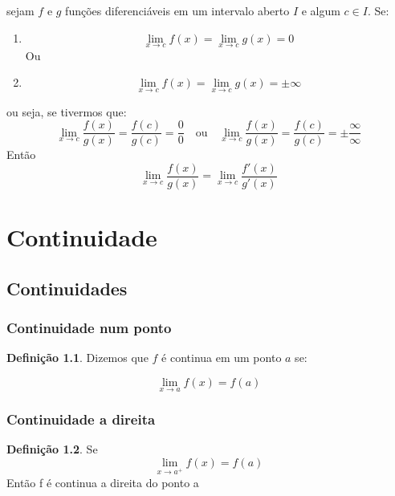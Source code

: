 \documentclass[14pt]{extreport}
\theoremstyle{definition}
\newtheorem{definition}{Definição}
\begin{document}
sejam \(f\) e \(g\) funções diferenciáveis em um intervalo aberto \(I\) e algum \(c \in I\). Se:
\begin{enumerate}
    \item{ 
        \[
            \lim_{x \to c} f(x) = \lim_{x \to c} g(x)  = 0 
        \]
    }
    Ou
    \item{ 
        \[
            \lim_{x \to c} f(x) = \lim_{x \to c} g(x)  = \pm \infty 
        \]
    }
\end{enumerate}
ou seja, se tivermos que:
\begin{equation*}
    \lim_{x \to c} \frac{f(x)}{g(x)} = \frac{f(c)}{g(c)} = \frac{0}{0} 
    \quad \text{ou} \quad
    \lim_{x \to c} \frac{f(x)}{g(x)} = \frac{f(c)}{g(c)} = \pm \frac{\infty}{\infty}
\end{equation*}
Então
\begin{equation}
    \lim_{x \to c} \frac{f(x)}{g(x)} = 
    \lim_{x \to c} \frac{f'(x)}{g'(x)} 
\end{equation}
    
\chapter{Continuidade}

\section{Continuidades}

\subsection{Continuidade num ponto}
\begin{definition}
    Dizemos que \(f\) é continua em um ponto \(a\) se:
    
    \begin{equation}
       \lim_{x \to a} f(x) = f(a) 
    \end{equation}
    
\end{definition}

\subsection{Continuidade a direita}

\begin{definition}
    Se
    \begin{equation}
       \lim_{x \to a^+} f(x) = f(a)  
    \end{equation}
    Então f é continua a direita do ponto a
\end{definition}
\end{document}
